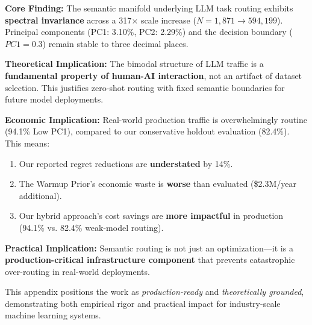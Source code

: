 \begin{tcolorbox}[colback=green!5!white,colframe=green!75!black,title=\textbf{Appendix D Summary: Global Manifold Stability}]
\textbf{Core Finding:} The semantic manifold underlying LLM task routing exhibits \textbf{spectral invariance} across a 317$\times$ scale increase ($N=1,871 \rightarrow 594,199$). Principal components (PC1: 3.10\%, PC2: 2.29\%) and the decision boundary ($PC1=0.3$) remain stable to three decimal places.

\textbf{Theoretical Implication:} The bimodal structure of LLM traffic is a \textbf{fundamental property of human-AI interaction}, not an artifact of dataset selection. This justifies zero-shot routing with fixed semantic boundaries for future model deployments.

\textbf{Economic Implication:} Real-world production traffic is overwhelmingly routine (94.1\% Low PC1), compared to our conservative holdout evaluation (82.4\%). This means:
\begin{enumerate}[noitemsep,topsep=2pt]
    \item Our reported regret reductions are \textbf{understated} by 14\%.
    \item The Warmup Prior's economic waste is \textbf{worse} than evaluated (\$2.3M/year additional).
    \item Our hybrid approach's cost savings are \textbf{more impactful} in production (94.1\% vs. 82.4\% weak-model routing).
\end{enumerate}

\textbf{Practical Implication:} Semantic routing is not just an optimization—it is a \textbf{production-critical infrastructure component} that prevents catastrophic over-routing in real-world deployments.
\end{tcolorbox}

This appendix positions the work as \emph{production-ready} and \emph{theoretically grounded}, demonstrating both empirical rigor and practical impact for industry-scale machine learning systems.

